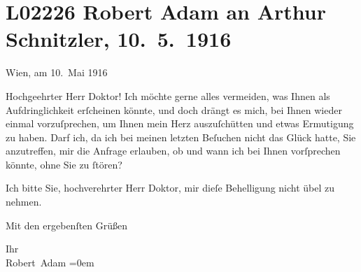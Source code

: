 

\section[Robert Adam an Arthur Schnitzler, 10. 5. 1916]{L02226 Robert Adam an Arthur Schnitzler, 10. 5. 1916}
\nopagebreak{}
\rehead{ }\normalsize\beginnumbering{}
\toendnotes[C]{\smallbreak\pagebreak[2]}
\toendnotes[C]{\smallbreak}
\pstart
           \raggedleft{}{\pb}Wien, am 10. Mai 1916\pend
           
\pstart{}Hochgeehrter Herr Doktor!\pend\vspace{0.5em}
\pstart
           Ich möchte gerne alles vermeiden, was Ihnen als Aufdringlichkeit erſcheinen könnte,
               und doch drängt es mich, bei Ihnen wieder einmal vorzuſprechen, um Ihnen mein Herz
               auszuſchütten und etwas Ermutigung zu haben. Darf ich, da ich bei meinen letzten
               Beſuchen nicht das Glück hatte, Sie anzutreffen, mir die Anfrage erlauben, ob und
               wann ich bei Ihnen vor{\pb}ſprechen könnte, ohne Sie zu{ }ſtören?\pend
           
\pstart
           Ich bitte Sie, hochverehrter Herr Doktor, mir dieſe Behelligung nicht übel zu
               nehmen.\pend
           
\pstart
           Mit den ergebenſten Grüßen\pend
           
\pstart
           Ihr{\\[\baselineskip]}\spacefill\mbox{Robert Adam}\pend
           \leftskip=0em{}\endnumbering{}  \newcommand{\dateiname}{L02226}\newcommand{\titel}{Robert Adam an Arthur Schnitzler, 10. 5. 1916}\newcommand{\editorInnen}{Martin Anton Müller und Gerd-Hermann Susen}
